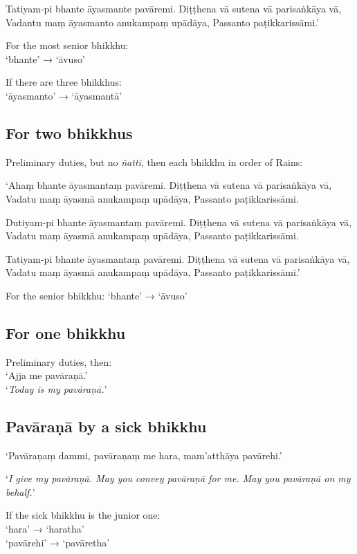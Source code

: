 Tatiyam-pi bhante āyasmante pavāremi. Diṭṭhena vā sutena vā parisaṅkāya vā,
Vadantu maṃ āyasmanto anukampaṃ upādāya, Passanto paṭikkarissāmi.’

For the most senior bhikkhu:\\
‘bhante’ → ‘āvuso’

If there are three bhikkhus:\\
‘āyasmanto’ → ‘āyasmantā’

\subsection{For two bhikkhus}

Preliminary duties, but no \emph{ñatti}, then each bhikkhu in order of Rains:

‘Ahaṃ bhante āyasmantaṃ pavāremi. Diṭṭhena vā sutena vā parisaṅkāya vā, Vadatu
maṃ āyasmā anukampaṃ upādāya, Passanto paṭikkarissāmi.

Dutiyam-pi bhante āyasmantaṃ pavāremi. Diṭṭhena vā sutena vā parisaṅkāya vā,
Vadatu maṃ āyasmā anukampaṃ upādāya, Passanto paṭikkarissāmi.

Tatiyam-pi bhante āyasmantaṃ pavāremi. Diṭṭhena vā sutena vā parisaṅkāya vā,
Vadatu maṃ āyasmā anukampaṃ upādāya, Passanto paṭikkarissāmi.’


For the senior bhikkhu: ‘bhante’ → ‘āvuso’

\subsection{For one bhikkhu}

Preliminary duties, then:\\
‘Ajja me pavāraṇā.’\\
‘\emph{Today is my pavāraṇā.}’ 

\subsection{Pavāraṇā by a sick bhikkhu}

‘Pavāraṇaṃ dammi, pavāraṇaṃ me hara, mam'atthāya pavārehi.’

‘\emph{I give my pavāraṇā. May you convey pavāraṇā for me. May you pavāraṇā on
  my behalf.}’


If the sick bhikkhu is the junior one:\\
‘hara’ → ‘haratha’\\
‘pavārehi’ → ‘pavāretha’

